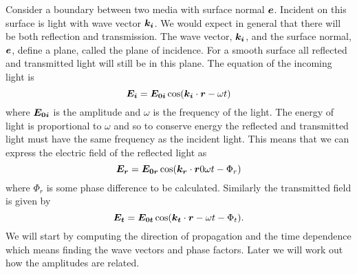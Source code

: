    Consider a boundary between two media with surface normal \(\bm{e}\).
    Incident on this surface is light with wave vector \(\bm{k_i}\).
    We would expect in general that there will be both reflection and transmission.
    The wave vector, \(\bm{k_i}\), and the surface normal, \(\bm{e}\), define a plane, called the plane of incidence.
    For a smooth surface all reflected and transmitted light will still be in this plane.
    The equation of the incoming light is
    \[\bm{E_i} = \bm{E_{0i}} \cos(\bm{k_i} \cdot \bm{r} - \omega t)\]
    where \(\bm{E_{0i}}\) is the amplitude and \(\omega\) is the frequency of the light.
    The energy of light is proportional to \(\omega\) and so to conserve energy the reflected and transmitted light must have the same frequency as the incident light.
    This means that we can express the electric field of the reflected light as
    \[\bm{E_r} = \bm{E_{0r}} \cos(\bm{k_r} \cdot \bm{r} 0 \omega t - \Phi_r)\]
    where \(\Phi_r\) is some phase difference to be calculated.
    Similarly the transmitted field is given by
    \[\bm{E_t} = \bm{E_{0t}} \cos(\bm{k_t} \cdot \bm{r} - \omega t - \Phi_t).\]
    We will start by computing the direction of propagation and the time dependence which means finding the wave vectors and phase factors.
    Later we will work out how the amplitudes are related.
    
